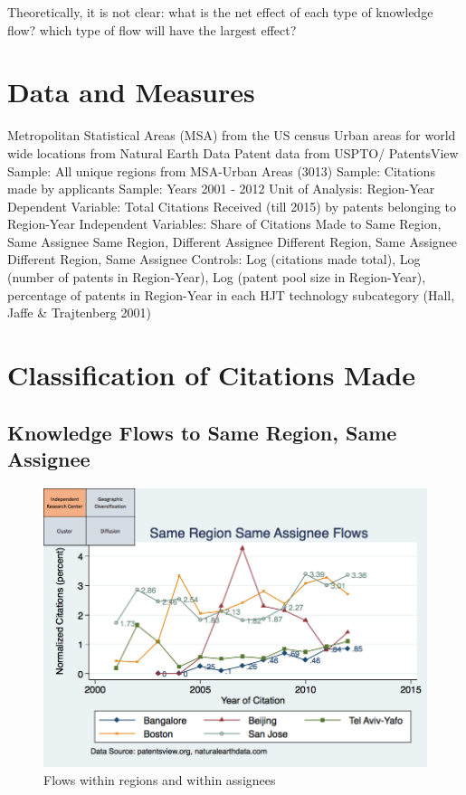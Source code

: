 \documentclass[12pt]{article}
\begin{document}
Theoretically, it is not clear:
what is the net effect of each type of knowledge flow?
which type of flow will have the largest effect?

\section{Data and Measures}
Metropolitan Statistical Areas (MSA) from the US census
Urban areas for world wide locations from Natural Earth Data
Patent data from USPTO/ PatentsView
Sample: All unique regions from MSA-Urban Areas (3013)
Sample: Citations made by applicants
Sample: Years 2001 - 2012
Unit of Analysis: Region-Year
Dependent Variable: Total Citations Received (till 2015) by patents belonging to Region-Year
Independent Variables: Share of Citations Made to
Same Region, Same Assignee
Same Region, Different Assignee
Different Region, Same Assignee
Different Region, Same Assignee
Controls: Log (citations made total), Log (number of patents in Region-Year), Log (patent pool size in Region-Year), percentage of patents in Region-Year in each HJT technology subcategory (Hall, Jaffe \& Trajtenberg 2001)

\section{Classification of Citations Made}
\subsection{Knowledge Flows to Same Region, Same Assignee}
\begin{figure}[h]
\begin{centering}
  \includegraphics[width=\textwidth]{SMSSameRegionSameAssigneeFlows}
  \caption{Flows within regions and within assignees}
  \label{fig:SMSSameRegionSameAssigneeFlows}
\end{centering}
\end{figure}
\end{document}
